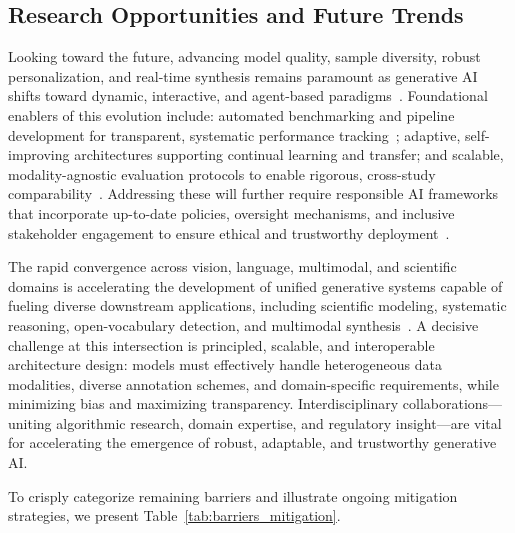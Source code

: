 \documentclass[sigconf]{acmart}
\begin{document}
\subsection{Research Opportunities and Future Trends}

Looking toward the future, advancing model quality, sample diversity, robust personalization, and real-time synthesis remains paramount as generative AI shifts toward dynamic, interactive, and agent-based paradigms~\cite{ref88,ref89,ref90,ref101,ref102}. Foundational enablers of this evolution include: automated benchmarking and pipeline development for transparent, systematic performance tracking~\cite{ref88,ref89}; adaptive, self-improving architectures supporting continual learning and transfer; and scalable, modality-agnostic evaluation protocols to enable rigorous, cross-study comparability~\cite{ref89}. Addressing these will further require responsible AI frameworks that incorporate up-to-date policies, oversight mechanisms, and inclusive stakeholder engagement to ensure ethical and trustworthy deployment~\cite{ref1,ref8,ref11,ref15,ref16,ref24,ref32,ref54,ref58,ref60,ref63,ref67,ref68,ref69,ref70,ref76,ref77,ref78,ref81,ref82,ref88,ref89}.

The rapid convergence across vision, language, multimodal, and scientific domains is accelerating the development of unified generative systems capable of fueling diverse downstream applications, including scientific modeling, systematic reasoning, open-vocabulary detection, and multimodal synthesis~\cite{ref1,ref2,ref3,ref5,ref6,ref7,ref8,ref9,ref10,ref12,ref13,ref14,ref15,ref16,ref18,ref21,ref22,ref24,ref25,ref26,ref27,ref28,ref29,ref30,ref31,ref32,ref33,ref34,ref35,ref39,ref40,ref42,ref43,ref44,ref45,ref51,ref52,ref53,ref54,ref55,ref56,ref57,ref58,ref59,ref60,ref63,ref67,ref69,ref70,ref76,ref77,ref78,ref79,ref80,ref81,ref82}. A decisive challenge at this intersection is principled, scalable, and interoperable architecture design: models must effectively handle heterogeneous data modalities, diverse annotation schemes, and domain-specific requirements, while minimizing bias and maximizing transparency. Interdisciplinary collaborations—uniting algorithmic research, domain expertise, and regulatory insight—are vital for accelerating the emergence of robust, adaptable, and trustworthy generative AI.

To crisply categorize remaining barriers and illustrate ongoing mitigation strategies, we present Table~\ref{tab:barriers_mitigation}.
\end{document}
